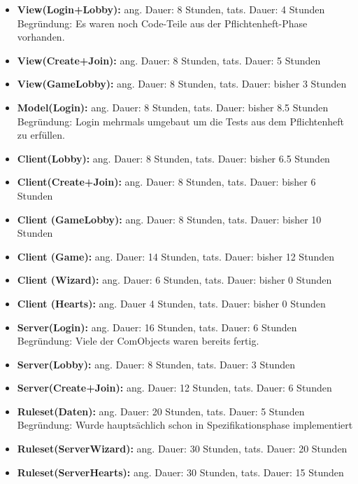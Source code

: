 \documentclass{article}
\begin{document}
\begin{itemize}
\item \textbf{View(Login+Lobby):} ang. Dauer: 8 Stunden, tats. Dauer: 4 Stunden \\
Begründung: Es waren noch Code-Teile aus der Pflichtenheft-Phase vorhanden. \\
\item \textbf{View(Create+Join):} ang. Dauer: 8 Stunden, tats. Dauer: 5 Stunden \\
\item \textbf{View(GameLobby):} ang. Dauer: 8 Stunden, tats. Dauer: bisher 3 Stunden \\
\item \textbf{Model(Login):} ang. Dauer: 8 Stunden, tats. Dauer: bisher 8.5 Stunden \\
Begründung: Login mehrmals umgebaut um die Tests aus dem Pflichtenheft zu erfüllen. \\
\item \textbf{Client(Lobby):} ang. Dauer: 8 Stunden, tats. Dauer: bisher 6.5 Stunden \\
\item \textbf{Client(Create+Join):} ang. Dauer: 8 Stunden, tats. Dauer: bisher 6 Stunden \\
\item \textbf{Client (GameLobby):} ang. Dauer: 8 Stunden, tats. Dauer: bisher 10 Stunden \\
\item \textbf{Client (Game):} ang. Dauer: 14 Stunden, tats. Dauer: bisher 12 Stunden \\
\item \textbf{Client (Wizard):} ang. Dauer: 6 Stunden, tats. Dauer: bisher 0 Stunden \\
\item \textbf{Client (Hearts):} ang. Dauer 4 Stunden, tats. Dauer: bisher 0 Stunden \\
\item \textbf{Server(Login):} ang. Dauer: 16 Stunden, tats. Dauer: 6 Stunden \\
Begründung: Viele der ComObjects waren bereits fertig.
\item \textbf{Server(Lobby):} ang. Dauer: 8 Stunden, tats. Dauer: 3 Stunden 
\item \textbf{Server(Create+Join):} ang. Dauer: 12 Stunden, tats. Dauer: 6 Stunden 
\item \textbf{Ruleset(Daten):} ang. Dauer: 20 Stunden, tats. Dauer: 5 Stunden
Begründung: Wurde hauptsächlich schon in Spezifikationsphase implementiert

\item \textbf{Ruleset(ServerWizard):} ang. Dauer: 30 Stunden, tats. Dauer: 20 Stunden

\item \textbf{Ruleset(ServerHearts):} ang. Dauer: 30 Stunden, tats. Dauer: 15 Stunden
\end{itemize}
\end{document}
